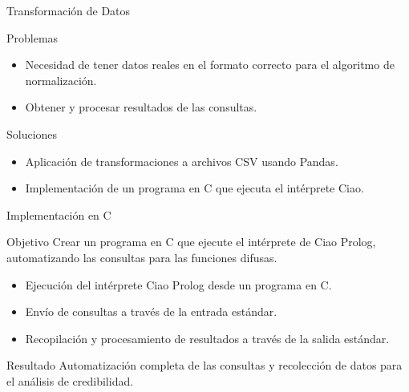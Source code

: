 \documentclass{beamer}
\newcommand{\slideauthor}[1]{\gdef\insertslideauthor{#1}}
\newcommand{\insertslideauthor}{}
\begin{document}
\begin{frame}{Transformación de Datos}
\slideauthor{Francisco J. González}
    \begin{block}{Problemas}
        \begin{itemize}
            \item Necesidad de tener datos reales en el formato correcto para el algoritmo de normalización.
            \item Obtener y procesar resultados de las consultas.
        \end{itemize}
    \end{block}
    \begin{block}{Soluciones}
        \begin{itemize}
            \item Aplicación de transformaciones a archivos CSV usando Pandas.
            \item Implementación de un programa en C que ejecuta el intérprete Ciao.
        \end{itemize}
    \end{block}
\end{frame}

\begin{frame}{Implementación en C}
\slideauthor{Francisco J. González}
    \begin{block}{Objetivo}
        Crear un programa en C que ejecute el intérprete de Ciao Prolog, automatizando las consultas para las funciones difusas.
    \end{block}
    \begin{itemize}
        \item Ejecución del intérprete Ciao Prolog desde un programa en C.
        \item Envío de consultas a través de la entrada estándar.
        \item Recopilación y procesamiento de resultados a través de la salida estándar.
    \end{itemize}
    \begin{block}{Resultado}
        Automatización completa de las consultas y recolección de datos para el análisis de credibilidad.
    \end{block}
\end{frame}
\end{document}
